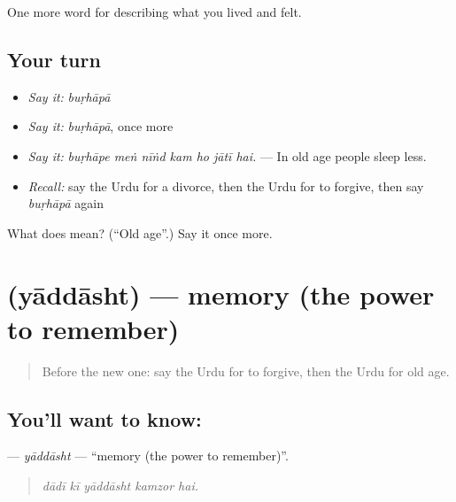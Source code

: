 \begin{grammarlens}[title={What you've built}]
One more word for describing what you lived and felt.
\end{grammarlens}

\subsection*{Your turn}
\begin{itemize}
\raggedright
  \item \emph{Say it:} \emph{buṛhāpā}
  \item \emph{Say it:} \emph{buṛhāpā}, once more
  \item \emph{Say it:} \emph{buṛhāpe meṅ nīṅd kam ho jātī hai.} — In old age people sleep less.
  \item \emph{Recall:} say the Urdu for a divorce, then the Urdu for to forgive, then say \emph{buṛhāpā} again
\end{itemize}

\begin{tcolorbox}[breakable,colback=teal!4,colframe=teal!35!black,title={Before you move on}]
What does  mean? (\textquotedblleft{}Old age\textquotedblright{}.) Say it once more.
\end{tcolorbox}
\section[\texorpdfstring{\ur{یادداشت} (yāddāsht)}{یادداشت (yāddāsht)}]{ (yāddāsht) — memory (the power to remember)}

\label{lesson:UR-C492-yaddasht}



\begin{quote}
Before the new one: say the Urdu for to forgive, then the Urdu for old age.
\end{quote}

\subsection*{You'll want to know: }
\textbf{} — \emph{yāddāsht} — \textquotedblleft{}memory (the power to remember)\textquotedblright{}.

\begin{quote}
    
\end{quote}

\begin{quote}
\emph{dādī kī yāddāsht kamzor hai.}
\end{quote}

